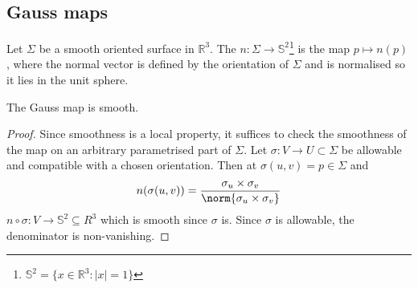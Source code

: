 \subsection{Gauss maps}
\begin{definition}
	Let $\Sigma$ be a smooth oriented surface in $\mathbb R^3$.
	The  $n \colon \Sigma \to \mathbb S^2$\footnote{$\mathbb{S}^2 = \{x \in \mathbb{R}^3 : |x| = 1\}$} is the map $p \mapsto n(p)$, where the normal vector is defined by the orientation of $\Sigma$ and is normalised so it lies in the unit sphere.
\end{definition}

\begin{lemma}
	The Gauss map is smooth.
\end{lemma}

\begin{proof}
	Since smoothness is a local property, it suffices to check the smoothness of the map on an arbitrary parametrised part of $\Sigma$.
	Let $\sigma \colon V \to U \subset \Sigma$ be allowable and compatible with a chosen orientation.
	Then at $\sigma(u, v) = p \in \Sigma$ and
	\begin{align*}
		n(\sigma(u, v)) = \frac{\sigma_u \times \sigma_v}{\norm{\sigma_u \times \sigma_v}}
	\end{align*}
	$n \circ \sigma : V \to \mathbb{S}^2 \subseteq R^3$ which is smooth since $\sigma$ is.
	Since $\sigma$ is allowable, the denominator is non-vanishing.
\end{proof}

